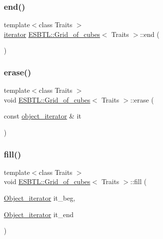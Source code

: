 \subsubsection{\texorpdfstring{end()}{end()}}
{\footnotesize\ttfamily template$<$class Traits $>$ \\
\hyperlink{classESBTL_1_1Grid__of__cubes_1_1iterator}{iterator} \hyperlink{structESBTL_1_1Grid__of__cubes}{E\+S\+B\+T\+L\+::\+Grid\+\_\+of\+\_\+cubes}$<$ Traits $>$\+::end (\begin{DoxyParamCaption}{ }\end{DoxyParamCaption})\hspace{0.3cm}{\ttfamily [inline]}}

\mbox{\label{structESBTL_1_1Grid__of__cubes_a43799f2fa1eacebe1fc213450c2d8e1c}} 
\subsubsection{\texorpdfstring{erase()}{erase()}}
{\footnotesize\ttfamily template$<$class Traits $>$ \\
void \hyperlink{structESBTL_1_1Grid__of__cubes}{E\+S\+B\+T\+L\+::\+Grid\+\_\+of\+\_\+cubes}$<$ Traits $>$\+::erase (\begin{DoxyParamCaption}\item[{const \hyperlink{classESBTL_1_1Grid__of__cubes_1_1object__iterator}{object\+\_\+iterator} \&}]{it }\end{DoxyParamCaption})\hspace{0.3cm}{\ttfamily [inline]}}

\mbox{\label{structESBTL_1_1Grid__of__cubes_a6842218abf9fc02e646270c2f55a4067}} 
\subsubsection{\texorpdfstring{fill()}{fill()}}
{\footnotesize\ttfamily template$<$class Traits $>$ \\
void \hyperlink{structESBTL_1_1Grid__of__cubes}{E\+S\+B\+T\+L\+::\+Grid\+\_\+of\+\_\+cubes}$<$ Traits $>$\+::fill (\begin{DoxyParamCaption}\item[{\hyperlink{structESBTL_1_1Grid__of__cubes_ae77665f05d6c7ae05c3d2d764df99193}{Object\+\_\+iterator}}]{it\+\_\+beg,  }\item[{\hyperlink{structESBTL_1_1Grid__of__cubes_ae77665f05d6c7ae05c3d2d764df99193}{Object\+\_\+iterator}}]{it\+\_\+end }\end{DoxyParamCaption})\hspace{0.3cm}{\ttfamily [inline]}}

